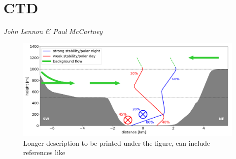 \documentclass[11pt,bibliography=totoc,openany,numbers=noendperiod]{scrbook}
\begin{document}
\mainmatter




\section{CTD}
\label{app:ctd}

\textit{John Lennon \& Paul McCartney}

\vspace{1cm}

\lipsum[1]
\begin{figure}[htbp]		%
    \centering				%
    \includegraphics[width=\textwidth]{./figures_john/schematic_ABL.png}
    \vspace{-20pt}		%
    \caption[Short description for list of figures]{Longer description to be printed under the figure, can include references like \citep{stull1988introduction}} %
	\label{app_john:fig1}		%
\end{figure}





   
\end{document}
